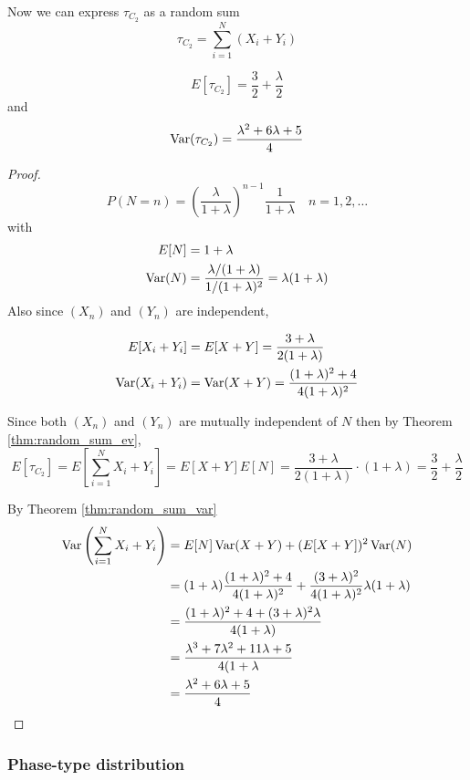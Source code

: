Now we can express $\tau_{C_2}$ as a random sum
$$
\tau_{C_2} = \sum_{i = 1}^N (X_i + Y_i)
$$

\begin{theorem}
$$
E[\tau_{C_2}] = \frac{3}{2} + \frac{\lambda}{2}
$$
and
$$
\operatorname {Var}(\tau_{C_2}) = \frac{\lambda^2 + 6 \lambda + 5}{4}
$$
\end{theorem}

\begin{proof}
$$
P(N = n) = \left(\frac{\lambda}{1 + \lambda} \right)^{n - 1} \frac{1}{1 + \lambda} \quad n = 1,2,\ldots
$$
with
\begin{align*}
    E[N] &= 1 + \lambda\\
    \operatorname {Var}(N) &= \frac{\lambda/(1 + \lambda)}{1/(1 + \lambda)^2} = \lambda (1 + \lambda)
\end{align*}
Also since $(X_n)$ and $(Y_n)$ are independent,

\begin{align*}
    E[X_i + Y_i] &= E[X + Y] = \frac{3 + \lambda}{2(1 + \lambda)}\\
    \operatorname {Var}(X_i + Y_i) &= \operatorname {Var}(X + Y) = \frac{(1 + \lambda)^2 + 4}{4(1 + \lambda)^2}
\end{align*}

Since both $(X_n)$ and $(Y_n)$ are mutually independent of $N$ then by Theorem \eqref{thm:random_sum_ev},
$$
E[\tau_{C_2}] = E\left[ \sum_{i = 1}^N X_i + Y_i \right] = E[X + Y] E[N] = \frac{3 + \lambda}{2(1 + \lambda)} \cdot (1 + \lambda) = \frac{3}{2} + \frac{\lambda}{2}
$$

By Theorem \ref{thm:random_sum_var}
\begin{align*}
    \operatorname {Var}\left( \sum_{i = 1}^N X_i + Y_i \right) &= E[N]\operatorname {Var}(X + Y) + (E[X + Y])^2 \operatorname {Var}(N)\\
    &= (1 + \lambda) \frac{(1 + \lambda)^2 + 4}{4(1 + \lambda)^2} + \frac{(3 + \lambda)^2}{4 (1 + \lambda)^2} \lambda (1 + \lambda)\\
    &= \frac{
        (1 + \lambda)^2 + 4 + (3 + \lambda)^2 \lambda
    }{4(1 + \lambda)}\\
    &= \frac{
    \lambda^3 + 7 \lambda^2 + 11 \lambda + 5
    }{4(1 + \lambda}\\
    &= \frac{\lambda^2 + 6 \lambda + 5}{4}
\end{align*}
\end{proof}

\subsubsection{Phase-type distribution}

